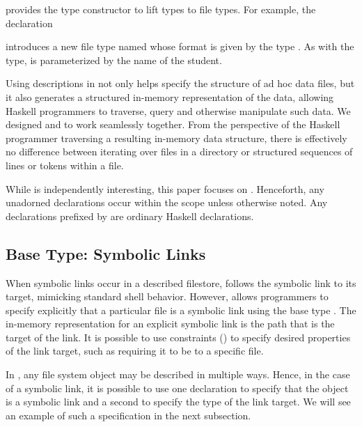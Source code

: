 \forest{} provides the  type constructor to lift \pads{}
types to \forest{} file types.  For example, the declaration
\begin{code}
[forest| \kw{type} SFile(n::String) = File(Student n) |]
\end{code}
introduces a new file type named  whose format is given by
the \pads{} type .  As with the \pads{} type, 
is parameterized by the name of the student.  

Using \padshaskell{} descriptions in \forest{} not only helps specify
the structure of ad hoc data files, but it also generates a structured
in-memory representation of the data, allowing Haskell programmers to
traverse, query and otherwise manipulate such data.  
We designed \padshaskell{} and \forest{} to work seamlessly
together.  From the perspective of the Haskell programmer traversing
a resulting in-memory data structure, there is effectively no difference
between iterating over files in a directory or structured sequences of
lines or tokens within a file.

While \padshaskell{} is independently interesting,
this paper focuses on \forest{}.  Henceforth, any
unadorned declarations occur within the \forest{} scope
\cd{[forest|...|]} unless otherwise noted.  Any declarations prefixed
by \cd{>} 
are ordinary Haskell declarations.

\subsection{Base Type: Symbolic Links}
\label{sec:symlinks}
When symbolic links occur in a described filestore,
\forest{} follows the symbolic link to its target, mimicking 
standard shell behavior.    However, \forest{} allows
programmers to specify explicitly that a particular file is a
symbolic link using the base type .  The in-memory
representation for an explicit symbolic link is the path that is the
target of the link.  It is possible to use constraints
() to specify desired properties of the link
target, such as requiring it to be to a specific file.

In \forest{}, any file system object may be described in multiple ways.
Hence, in the case of a symbolic link, it is possible to use one declaration to
specify that the object is a symbolic link and a second to specify
the type of the link target.  We will see an example of such a specification in the
next subsection. 

